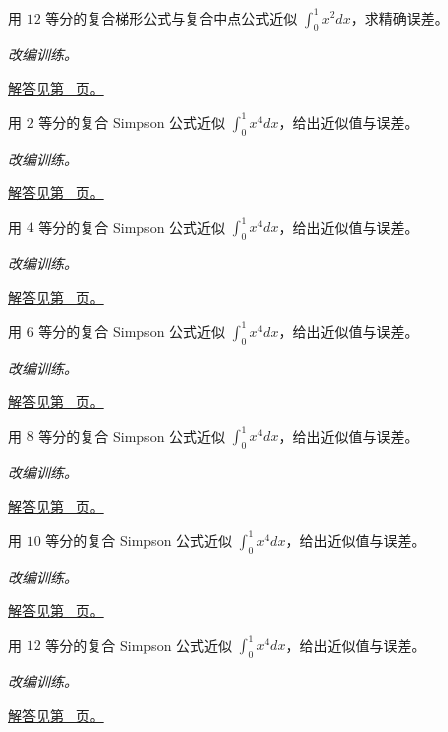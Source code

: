 \documentclass[UTF8,12pt,a4paper,fontset=fandol]{ctexart}
\begin{document}
\begin{example}[二次函数的梯形与中点公式]\label{ex:c18q6}
用 $12$ 等分的复合梯形公式与复合中点公式近似 $\int_0^1x^2dx$，求精确误差。
\par\textit{改编训练。}\par\hyperref[ans:c18q6]{解答见第~\pageref{ans:c18q6} 页。}
\end{example}
\begin{example}\label{ex:c18q7}
用 $2$ 等分的复合 Simpson 公式近似 $\int_0^1x^4dx$，给出近似值与误差。
\par\textit{改编训练。}\par\hyperref[ans:c18q7]{解答见第~\pageref{ans:c18q7} 页。}
\end{example}
\begin{example}\label{ex:c18q8}
用 $4$ 等分的复合 Simpson 公式近似 $\int_0^1x^4dx$，给出近似值与误差。
\par\textit{改编训练。}\par\hyperref[ans:c18q8]{解答见第~\pageref{ans:c18q8} 页。}
\end{example}
\begin{example}\label{ex:c18q9}
用 $6$ 等分的复合 Simpson 公式近似 $\int_0^1x^4dx$，给出近似值与误差。
\par\textit{改编训练。}\par\hyperref[ans:c18q9]{解答见第~\pageref{ans:c18q9} 页。}
\end{example}
\begin{example}\label{ex:c18q10}
用 $8$ 等分的复合 Simpson 公式近似 $\int_0^1x^4dx$，给出近似值与误差。
\par\textit{改编训练。}\par\hyperref[ans:c18q10]{解答见第~\pageref{ans:c18q10} 页。}
\end{example}
\begin{example}\label{ex:c18q11}
用 $10$ 等分的复合 Simpson 公式近似 $\int_0^1x^4dx$，给出近似值与误差。
\par\textit{改编训练。}\par\hyperref[ans:c18q11]{解答见第~\pageref{ans:c18q11} 页。}
\end{example}
\begin{example}\label{ex:c18q12}
用 $12$ 等分的复合 Simpson 公式近似 $\int_0^1x^4dx$，给出近似值与误差。
\par\textit{改编训练。}\par\hyperref[ans:c18q12]{解答见第~\pageref{ans:c18q12} 页。}
\end{example}
\end{document}
